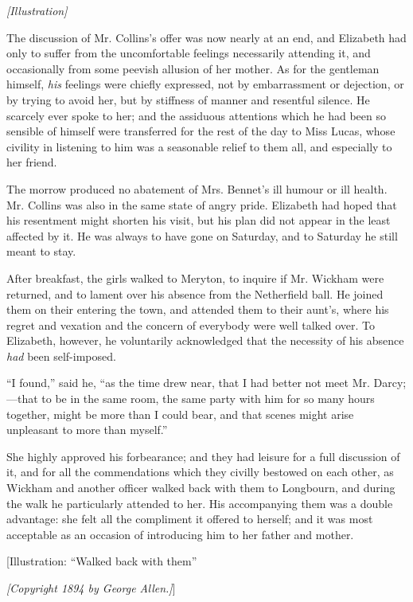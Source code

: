 \documentclass[12pt]{book}
\begin{document}
\emph{[Illustration]}

The discussion of Mr. Collins's offer was now nearly at an end, and Elizabeth had only to suffer from the uncomfortable feelings necessarily attending it, and occasionally from some peevish allusion of her mother. As for the gentleman himself, \textit{his} feelings were chiefly expressed, not by embarrassment or dejection, or by trying to avoid her, but by stiffness of manner and resentful silence. He scarcely ever spoke to her; and the assiduous attentions which he had been so sensible of himself were transferred for the rest of the day to Miss Lucas, whose civility in listening to him was a seasonable relief to them all, and especially to her friend.

The morrow produced no abatement of Mrs. Bennet's ill humour or ill health. Mr. Collins was also in the same state of angry pride. Elizabeth had hoped that his resentment might shorten his visit, but his plan did not appear in the least affected by it. He was always to have gone on Saturday, and to Saturday he still meant to stay.

After breakfast, the girls walked to Meryton, to inquire if Mr. Wickham were returned, and to lament over his absence from the Netherfield ball. He joined them on their entering the town, and attended them to their aunt's, where his regret and vexation and the concern of everybody were well talked over. To Elizabeth, however, he voluntarily acknowledged that the necessity of his absence \textit{had} been self-imposed.

``I found,'' said he, ``as the time drew near, that I had better not meet Mr. Darcy;---that to be in the same room, the same party with him for so many hours together, might be more than I could bear, and that scenes might arise unpleasant to more than myself.''

She highly approved his forbearance; and they had leisure for a full discussion of it, and for all the commendations which they civilly bestowed on each other, as Wickham and another officer walked back with them to Longbourn, and during the walk he particularly attended to her. His accompanying them was a double advantage: she felt all the compliment it offered to herself; and it was most acceptable as an occasion of introducing him to her father and mother.

[Illustration: ``Walked back with them''

\emph{[\textit{Copyright 1894 by George Allen.}]}]
\end{document}
